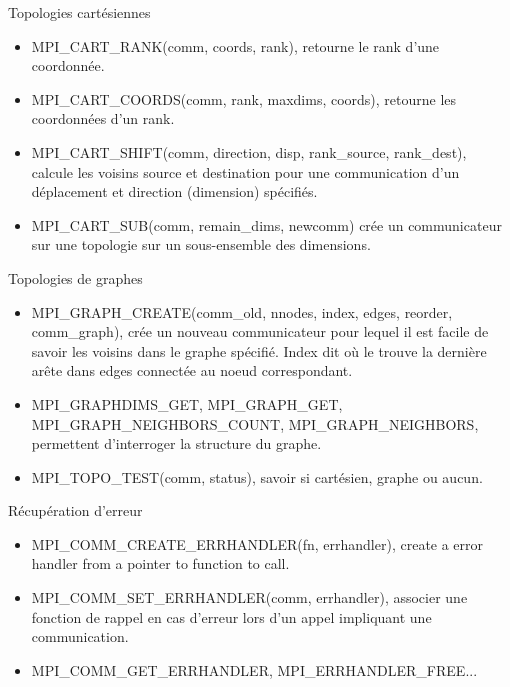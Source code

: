 \documentclass[10pt]{beamer}
\begin{document}
\begin{frame}{Topologies cartésiennes}

  \begin{itemize}
    \item MPI\_CART\_RANK(comm, coords, rank), retourne le rank d'une coordonnée.

    \item MPI\_CART\_COORDS(comm, rank, maxdims, coords), retourne les coordonnées d'un rank.

    \item MPI\_CART\_SHIFT(comm, direction, disp, rank\_source, rank\_dest), calcule les voisins source et destination pour une communication d'un déplacement et direction (dimension) spécifiés.

    \item MPI\_CART\_SUB(comm, remain\_dims, newcomm) crée un communicateur sur une topologie sur un sous-ensemble des dimensions.
  \end{itemize}
\end{frame}

\begin{frame}{Topologies de graphes}

  \begin{itemize}
    \item MPI\_GRAPH\_CREATE(comm\_old, nnodes, index, edges, reorder, comm\_graph), crée un nouveau communicateur pour lequel il est facile de savoir les voisins dans le graphe spécifié. Index dit où le trouve la dernière arête dans edges connectée au noeud correspondant.

    \item MPI\_GRAPHDIMS\_GET, MPI\_GRAPH\_GET, MPI\_GRAPH\_NEIGHBORS\_COUNT, MPI\_GRAPH\_NEIGHBORS, permettent d'interroger la structure du graphe.

    \item MPI\_TOPO\_TEST(comm, status), savoir si cartésien, graphe ou aucun.
  \end{itemize}
\end{frame}

\begin{frame}{Récupération d'erreur}

  \begin{itemize}
    \item MPI\_COMM\_CREATE\_ERRHANDLER(fn, errhandler), create a error handler from a pointer to function to call.

    \item MPI\_COMM\_SET\_ERRHANDLER(comm, errhandler), associer une fonction de rappel en cas d'erreur lors d'un appel impliquant une communication.

    \item MPI\_COMM\_GET\_ERRHANDLER, MPI\_ERRHANDLER\_FREE...
  \end{itemize}
\end{frame}
\end{document}

